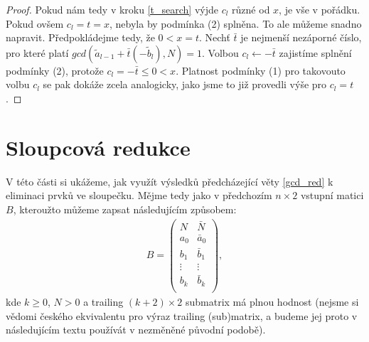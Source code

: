 \begin{proof}
Pokud nám tedy v kroku \ref{t_search} výjde $ c_l $ různé od $ x $, je vše v pořádku.
Pokud ovšem $ c_l = t = x $, nebyla by podmínka (2) splněna.
To ale můžeme snadno napravit. Předpokládejme tedy, že $ 0 < x = t $.
Nechť $ \bar{t} $ je nejmenší nezáporné číslo, pro které platí
$ gcd(\tilde{a}_{l-1} + \bar{t} (-\tilde{b}_{l}), N) = 1 $. Volbou $ c_l \leftarrow -\bar{t}$
zajistíme splnění podmínky (2), protože $ c_l = -\bar{t} \leq 0 < x $. Platnost
podmínky (1) pro takovouto volbu $ c_l $ se pak dokáže zcela analogicky, jako
jsme to již provedli výše pro $ c_l = t $.
\end{proof}





\section{Sloupcová redukce}

V této části si ukážeme, jak využít výsledků předcházející věty \ref{gcd_red} k
eliminaci prvků ve sloupečku. Mějme tedy jako v předchozím $ n \times 2 $
vstupní matici $ B $, kteroužto můžeme zapsat následujícím způsobem:
\begin{align} \label{B_col}
B =
    \begin{pmatrix}
        N & \bar{N} \\
        a_0 & \bar{a}_0  \\
        b_1 & \bar{b}_1  \\
        \vdots & \vdots  \\
        b_k & \bar{b}_k  \\
    \end{pmatrix}
,
\end{align}
kde $ k \geq 0 $, $ N > 0 $ a trailing $ (k+2) \times 2 $ submatrix má plnou
hodnost (nejsme si vědomi českého ekvivalentu pro výraz trailing (sub)matrix,
a budeme jej proto v následujícím textu používát v nezměněné původní podobě).


